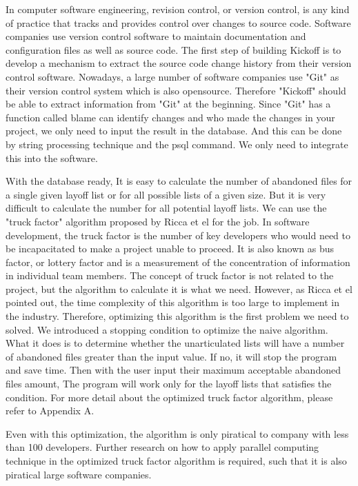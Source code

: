 \documentclass[12pt, a4paper, openright]{report}
\begin{document}
In computer software engineering, revision control, or version control, is any kind of practice that tracks and provides control over changes to source code. Software companies use version control software to maintain documentation and configuration files as well as source code.
The first step of building Kickoff is to develop a mechanism to extract the source code change history from their version control software. Nowadays, a large number of software companies use "Git" as their version control system which is also opensource. Therefore "Kickoff" should be able to extract information from "Git" at the beginning. Since "Git" has a function called blame can identify changes and who made the changes in your project, we only need to input the result in the database. And this can be done by string processing technique and the psql command. We only need to integrate this into the software.    

With the database ready, It is easy to calculate the number of abandoned files for a single given layoff list or for all possible lists of a given size. But it is very difficult to calculate the number for all potential layoff lists. 
We can use the "truck factor" algorithm proposed by Ricca et el \cite{Ricca2011PROFES} for the job. In software development, the truck factor is the number of key developers who would need to be incapacitated to make a project unable to proceed. It is also known as bus factor, or lottery factor and is a measurement of the concentration of information in individual team members. The concept of truck factor is not related to the project, but the algorithm to calculate it is what we need. However, as Ricca et el pointed out\cite{Ricca2011PROFES}, the time complexity of this algorithm is too large to implement in the industry. Therefore, optimizing this algorithm is the first problem we need to solved. We introduced a stopping condition to optimize the naive algorithm. What it does is to determine whether the unarticulated lists will have a number of abandoned files greater than the input value. If no, it will stop the program and save time. Then with the user input their maximum acceptable abandoned files amount, The program will work only for the layoff lists that satisfies the condition. For more detail about the optimized truck factor algorithm, please refer to Appendix A.  


Even with this optimization, the algorithm is only piratical to company with less than 100 developers. Further research on how to apply parallel computing technique in the optimized truck factor algorithm is required, such that it is also piratical large software companies.
\end{document}
